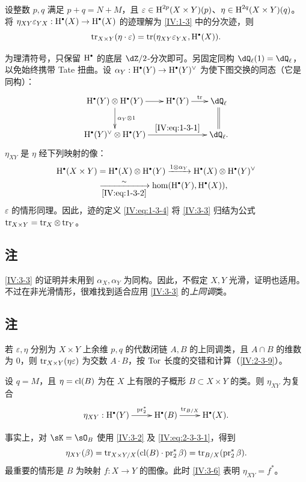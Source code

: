 \begin{proposition_}\label{IV:3-3}
设整数 $p,q$ 满足 $p+q=N+M$，且 $\varepsilon\in\operatorname{H}^{2p}(X\times Y)(p)$、$\eta\in\operatorname{H}^{2q}(X\times Y)(q)$。将 $\eta_{XY}\varepsilon_{YX}:\h^\bullet(X)\to\h^\bullet(X)$ 的迹理解为 \ref{IV:1-3} 中的分次迹，则
\[
\tr_{X\times Y}(\eta\cdot\varepsilon)
=\tr(\eta_{XY}\varepsilon_{YX},\h^\bullet(X)).
\]
\end{proposition_}
为理清符号，只保留 $\h^\bullet$ 的底层 $\dZ/2$-分次即可。另固定同构 $\dQ_\ell(1)=\dQ_\ell$，以免始终携带 Tate 扭曲。设 $\alpha_Y:\h^\bullet(Y)\to\h^\bullet(Y)^\vee$ 为使下图交换的同态（它是同构）：
\[\xymatrix@C=18pt{
\h^\bullet(Y)\otimes\h^\bullet(Y)\ar[r]\ar[d]^-{\alpha_Y\otimes1}&\h^\bullet(Y)\ar[r]^-\tr&\dQ_\ell\ar@{=}[d]\\
\h^\bullet(Y)^\vee\otimes\h^\bullet(Y)\ar[rr]^-{\eqref{IV:eq:1-3-1}}&&\dQ_\ell.
}\]
$\eta_{XY}$ 是 $\eta$ 经下列映射的像：
\[
\begin{aligned}
\h^\bullet(X\times Y)&=\h^\bullet(X)\otimes\h^\bullet(Y)
\xrightarrow{1\otimes\alpha_Y}\h^\bullet(X)\otimes\h^\bullet(Y)^\vee\\
&\xrightarrow[\eqref{IV:eq:1-3-2}]{\sim}\hom(\h^\bullet(Y),\h^\bullet(X)),
\end{aligned}
\]
$\varepsilon$ 的情形同理。因此，迹的定义 \eqref{IV:eq:1-3-4} 将 \ref{IV:3-3} 归结为公式 $\operatorname{tr}_{X\times Y}=\operatorname{tr}_X\otimes\operatorname{tr}_Y$。

\subsection{注}\label{IV:3-4}
\ref{IV:3-3} 的证明并未用到 $\alpha_X,\alpha_Y$ 为同构。因此，不假定 $X,Y$ 光滑，证明也适用。不过在非光滑情形，很难找到适合应用 \ref{IV:3-3} 的\emph{上同调}类。

\subsection{注}\label{IV:3-5}
若 $\varepsilon,\eta$ 分别为 $X\times Y$ 上余维 $p,q$ 的代数闭链 $A,B$ 的上同调类，且 $A\cap B$ 的维数为 $0$，则 $\operatorname{tr}_{X\times Y}(\eta\varepsilon)$ 为交数 $A\cdot B$，按 $\operatorname{Tor}$ 长度的交错和计算（\ref{IV:2-3-9}）。

\begin{proposition_}\label{IV:3-6}
设 $q=M$，且 $\eta=\operatorname{cl}(B)$ 为在 $X$ 上有限的子概形 $B\subset X\times Y$ 的类。则 $\eta_{XY}$ 为复合
\[\xymatrix{\eta_{XY}:\h^\bullet(Y)\ar[r]^-{\operatorname{pr}_2^*}&\h^\bullet(B)\ar[r]^-{\tr_{B/X}}&\h^\bullet(X).}\]
\end{proposition_}
事实上，对 $\sK=\sO_B$ 使用 \ref{IV:3-2} 及 \eqref{IV:eq:2-3-3-1}，得到
\[
\eta_{XY}(\beta)=\operatorname{tr}_{X\times Y/X}(\operatorname{cl}(B)\cdot\operatorname{pr}_2^*\beta)
=\operatorname{tr}_{B/X}(\operatorname{pr}_2^*\beta).
\]
最重要的情形是 $B$ 为映射 $f:X\to Y$ 的图像。此时 \ref{IV:3-6} 表明 $\eta_{XY}=f^*$。

